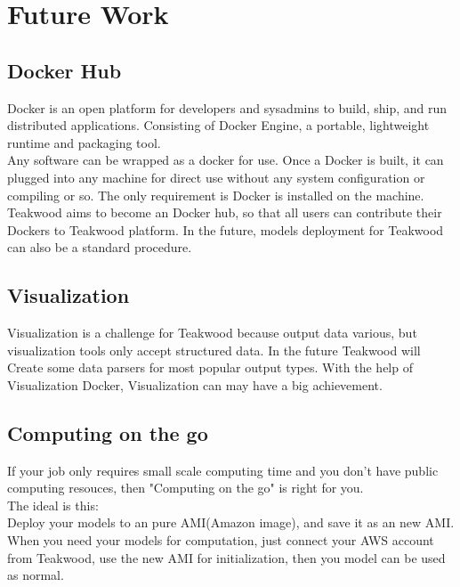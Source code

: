 \chapter{Future Work}

\section{Docker Hub}
Docker is an open platform for developers and sysadmins to build, ship, and run distributed applications. Consisting of Docker Engine, a portable, lightweight runtime and packaging tool.\\
Any software can be wrapped as a docker for use. Once a Docker is built, it can plugged into any machine for direct use without any system configuration or compiling or so. The only requirement is Docker is installed on the machine.\\
Teakwood aims to become an Docker hub, so that all users can contribute their Dockers to Teakwood platform. In the future, models deployment for Teakwood can also be a standard procedure.

\section{Visualization}
Visualization is a challenge for Teakwood because output data various, but visualization tools only accept structured data. In the future Teakwood will Create some data parsers for most popular output types. With the help of Visualization Docker, Visualization can may have a big achievement.
\section{Computing on the go}
If your job only requires small scale computing time and you don't have public computing resouces, then "Computing on the go" is right for you.\\
The ideal is this:\\
Deploy your models to an pure AMI(Amazon image), and save it as an new AMI. When you need your models for computation, just connect your AWS account from Teakwood, use the new AMI for initialization, then you model can be used as normal. 